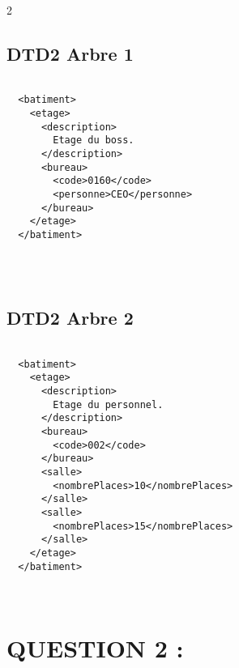 \documentclass[10pt]{article}
\newenvironment{DDbox}[1]{
\begin{lrbox}{\BBbox}\begin{minipage}{\linewidth}}
{\end{minipage}\end{lrbox}\noindent\colorbox{white}{\usebox{\BBbox}} \\
[.5cm]}
\begin{document}
\begin{multicols}{2}
  \subsection{DTD2 Arbre 1}



  \begin{DDbox}{\linewidth}
  \begin{lstlisting}

  <batiment>
    <etage>
      <description>
        Etage du boss.
      </description>
      <bureau>
        <code>0160</code>
        <personne>CEO</personne>
      </bureau>
    </etage>
  </batiment>


  \end{lstlisting}
  \end{DDbox}
\subsection{DTD2 Arbre 2}



\begin{DDbox}{\linewidth}
\begin{lstlisting}

  <batiment>
    <etage>
      <description>
        Etage du personnel.
      </description>
      <bureau>
        <code>002</code>
      </bureau>
      <salle>
        <nombrePlaces>10</nombrePlaces>
      </salle>
      <salle>
        <nombrePlaces>15</nombrePlaces>
      </salle>
    </etage>
  </batiment>

  \end{lstlisting}
  \end{DDbox}
\end{multicols}
  \section{QUESTION 2 :}
\end{document}
